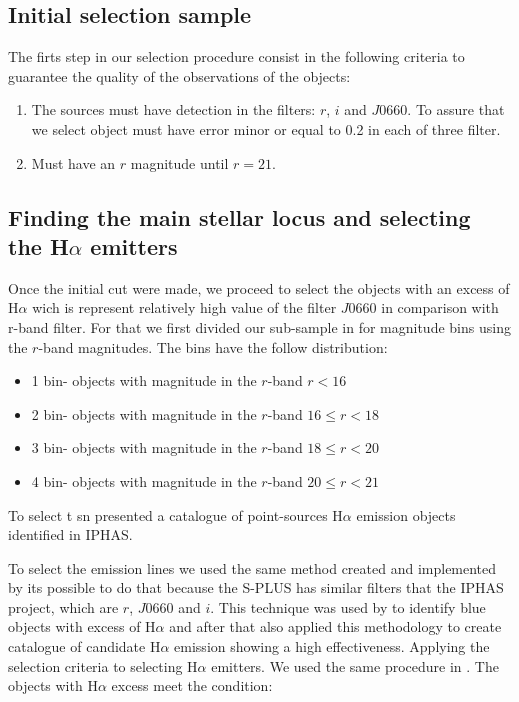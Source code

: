 \documentclass[fleqn,usenatbib]{mnras}
\begin{document}
\subsection{Initial selection sample}
\label{sec:}

The firts step in our selection procedure consist in the following criteria to guarantee the quality of the observations of the objects:

\begin{enumerate}
\item The sources must have detection in the filters: $r$, $i$ and $J$0660. To assure that we select object must have error minor or equal to 0.2 in each of three filter.

\item Must have an $r$ magnitude until $r = 21$.
  
\end{enumerate}

\subsection{Finding the main stellar locus and selecting the H{$\alpha$ emitters} }
\label{sec:}

Once the initial cut were made, we proceed to select the objects with an excess of H{$\alpha$} wich is represent relatively high value of the filter $J$0660 in comparison with r-band filter. For that we first divided our sub-sample in for magnitude bins using the $r$-band magnitudes. The bins have the follow distribution:

\begin{itemize}
\item 1 bin- objects with magnitude in the $r$-band $r < 16$
\item 2 bin- objects with magnitude in the $r$-band $16 \leq r < 18$
\item 3 bin- objects with magnitude in the $r$-band $18 \leq r < 20$
\item 4 bin- objects with magnitude in the $r$-band $20 \leq r < 21$
  
\end{itemize}

To select t sn
\citet{Witham:2008} presented a catalogue of point-sources H{$\alpha$} emission objects identified in IPHAS. 

To select the emission lines we used the same method created and implemented by \citet{Witham:2008} its possible to do that because the S-PLUS has similar filters that the IPHAS project, which are $r$, $J$0660 and $i$. This technique was used by \citet{Scaringi:2013} to identify blue objects with excess of H{$\alpha$} and after that \citet{Wevers:2017} also applied this methodology to create catalogue of candidate H{$\alpha$} emission showing a high effectiveness.    
Applying the selection criteria to selecting H$\alpha$ emitters. We used the same procedure in  \citet{Wevers:2017}. The objects with H$\alpha$ excess meet the condition:
\end{document}
